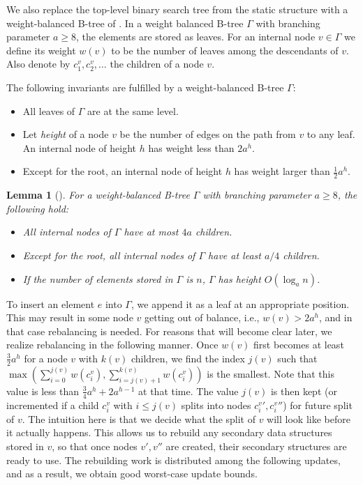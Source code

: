 \documentclass[a4paper]{article}
\newtheorem{lemma}[theorem]{Lemma}
\theoremstyle{remark}
\begin{document}
We also replace the top-level binary search tree from the static
structure with a weight-balanced B-tree of \cite{Arge:2003}.
In a weight balanced B-tree $\Gamma$ with branching parameter $a\geq 8$,
the elements are stored as leaves.
For an internal node $v\in\Gamma$ we define its weight $w(v)$ to be
the number of leaves among the descendants of $v$.
Also denote by $c^v_1,c^v_2,\ldots$ the children of a node $v$.

The following invariants are fulfilled by a weight-balanced B-tree $\Gamma$:
\begin{itemize}
\item All leaves of $\Gamma$ are at the same level.
\item
  Let \emph{height} of a node $v$ be the number of edges
on the path from $v$ to any leaf.
An internal node of height $h$ has weight less than $2a^h$.
\item Except for the root, an internal node of height $h$ has weight
  larger than $\frac{1}{2}a^h$.
\end{itemize}
\begin{lemma}[\cite{Arge:2003}]
For a weight-balanced B-tree $\Gamma$ with branching parameter $a\geq 8$,
the following hold:
\begin{itemize}
    \item All internal nodes of $\Gamma$ have at most $4a$ children.
    \item Except for the root, all internal nodes of $\Gamma$ have at least $a/4$ children.
    \item If the number of elements stored in $\Gamma$ is $n$, $\Gamma$
      has height $O(\log_a{n})$.
\end{itemize}
\end{lemma}
To insert an element $e$ into $\Gamma$, we append it as a leaf
at an appropriate position.
This may result in some node $v$ getting out of balance,
i.e., $w(v)>2a^h$, and in that case rebalancing is needed.
For reasons that will become clear later, we realize rebalancing
in the following manner.
Once $w(v)$ first becomes at least $\frac{3}{2}a^h$ for a node $v$ with
$k(v)$ children, we find the index $j(v)$ such that
$\max\left(\sum_{i=0}^{j(v)}w(c^v_i),\sum_{i=j(v)+1}^{k(v)} w(c^v_i)\right)$
is the smallest.
Note that this value is less than $\frac{3}{4}a^h+2a^{h-1}$
at that time.
The value $j(v)$ is then kept (or incremented if a child $c^v_i$
with $i\leq j(v)$ splits into nodes ${c^v_i}',{c^v_i}''$) for
future split of $v$.
The intuition here is that we decide what the split of $v$ will look
like before it actually happens.
This allows us to rebuild any secondary data structures stored in $v$,
so that once nodes $v',v''$ are created, their secondary structures
are ready to use.
The rebuilding work is distributed among the following updates,
and as a result, we obtain good worst-case update bounds.
\end{document}
